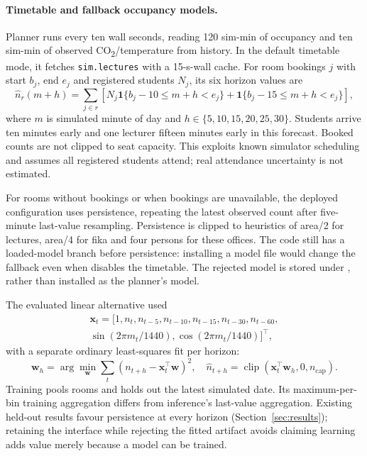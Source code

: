 \documentclass[11pt,a4paper]{article}
\begin{document}
\paragraph{Timetable and fallback occupancy models.}
Planner runs every ten wall seconds, reading 120 sim-min of occupancy and ten sim-min of observed CO\textsubscript{2}/temperature from history. In the default timetable mode, it fetches \texttt{sim.lectures} with a 15-s-wall cache. For room bookings $j$ with start $b_j$, end $e_j$ and registered students $N_j$, its six horizon values are
\begin{equation}
\widehat n_r(m+h)=\sum_{j\in r}\left[
N_j\mathbf1\{b_j-10\leq m+h<e_j\}
+\mathbf1\{b_j-15\leq m+h<e_j\}\right],
\end{equation}
where $m$ is simulated minute of day and $h\in\{5,10,15,20,25,30\}$. Students arrive ten minutes early and one lecturer fifteen minutes early in this forecast. Booked counts are not clipped to seat capacity. This exploits known simulator scheduling and assumes all registered students attend; real attendance uncertainty is not estimated.

For rooms without bookings or when bookings are unavailable, the deployed configuration uses persistence, repeating the latest observed count after five-minute last-value resampling. Persistence is clipped to heuristics of area/2 for lectures, area/4 for fika and four persons for these offices. The code still has a loaded-model branch before persistence: installing a model file would change the fallback even when \protect{} disables the timetable. The rejected model is stored under \protect{}, rather than installed as the planner's model.

The evaluated linear alternative used
\begin{equation}
\begin{split}
\mathbf x_t=[1,n_t,n_{t-5},n_{t-10},n_{t-15},n_{t-30},n_{t-60},\\
\sin(2\pi m_t/1440),\cos(2\pi m_t/1440)]^\top,
\end{split}
\end{equation}
with a separate ordinary least-squares fit per horizon:
\begin{equation}
\mathbf w_h=\arg\min_{\mathbf w}\sum_t(n_{t+h}-\mathbf x_t^\top\mathbf w)^2,
\quad \widehat n_{t+h}=\operatorname{clip}(\mathbf x_t^\top\mathbf w_h,0,n_{\mathrm{cap}}).
\end{equation}
Training pools rooms and holds out the latest simulated date. Its maximum-per-bin training aggregation differs from inference's last-value aggregation. Existing held-out results favour persistence at every horizon (Section~\ref{sec:results}); retaining the interface while rejecting the fitted artifact avoids claiming learning adds value merely because a model can be trained.
\end{document}
